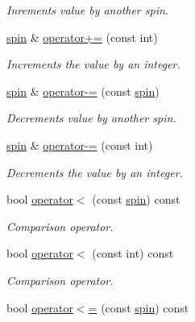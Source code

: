 \begin{DoxyCompactItemize}
\begin{DoxyCompactList}\small\item\em Inrements value by another spin. \end{DoxyCompactList}\item 
\hypertarget{a00514_ae268507e94fd756dd87d3bdbbefda66b}{}\hyperlink{a00514}{spin} \& \hyperlink{a00514_ae268507e94fd756dd87d3bdbbefda66b}{operator+=} (const int)\label{a00514_ae268507e94fd756dd87d3bdbbefda66b}

\begin{DoxyCompactList}\small\item\em Increments the value by an integer. \end{DoxyCompactList}\item 
\hypertarget{a00514_ae3480265f0f41e69b1e5b2754710061a}{}\hyperlink{a00514}{spin} \& \hyperlink{a00514_ae3480265f0f41e69b1e5b2754710061a}{operator-\/=} (const \hyperlink{a00514}{spin})\label{a00514_ae3480265f0f41e69b1e5b2754710061a}

\begin{DoxyCompactList}\small\item\em Decrements value by another spin. \end{DoxyCompactList}\item 
\hypertarget{a00514_aa38d773c35cccc858884e1e09f6f6d85}{}\hyperlink{a00514}{spin} \& \hyperlink{a00514_aa38d773c35cccc858884e1e09f6f6d85}{operator-\/=} (const int)\label{a00514_aa38d773c35cccc858884e1e09f6f6d85}

\begin{DoxyCompactList}\small\item\em Decrements the value by an integer. \end{DoxyCompactList}\item 
\hypertarget{a00514_ae038724721dc3e9d5de32359487da454}{}bool \hyperlink{a00514_ae038724721dc3e9d5de32359487da454}{operator$<$} (const \hyperlink{a00514}{spin}) const \label{a00514_ae038724721dc3e9d5de32359487da454}

\begin{DoxyCompactList}\small\item\em Comparison operator. \end{DoxyCompactList}\item 
\hypertarget{a00514_ad1fb7b89bb8acdbc804f1ca154b375a8}{}bool \hyperlink{a00514_ad1fb7b89bb8acdbc804f1ca154b375a8}{operator$<$} (const int) const \label{a00514_ad1fb7b89bb8acdbc804f1ca154b375a8}

\begin{DoxyCompactList}\small\item\em Comparison operator. \end{DoxyCompactList}\item 
\hypertarget{a00514_a3dd8f6e42dd7d196ee201ff2c35ed418}{}bool \hyperlink{a00514_a3dd8f6e42dd7d196ee201ff2c35ed418}{operator$<$=} (const \hyperlink{a00514}{spin}) const \label{a00514_a3dd8f6e42dd7d196ee201ff2c35ed418}


\end{DoxyCompactItemize}
